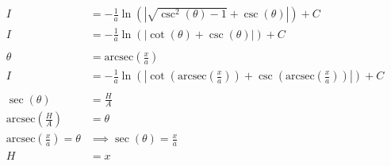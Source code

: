 \documentclass[12pt]{article}
\begin{document}
\begin{align}
    I                                                      & = -\frac{1}{a} \ln(|\sqrt{\csc^2(\theta)-1}+\csc(\theta)|) + C                                                                                                \\
    I                                                      & = -\frac{1}{a} \ln(|\cot(\theta)+\csc(\theta)|) + C                                                                                                           \\
    \nonumber                                                                                                                                                                                                              \\
    \theta                                                 & = \text{arcsec}\left(\frac{x}{a}\right)
    \nonumber                                                                                                                                                                                                              \\
    I                                                      & = -\frac{1}{a} \ln\left(\left|\cot\left(\text{arcsec}\left(\frac{x}{a}\right)\right)+\csc\left(\text{arcsec}\left(\frac{x}{a}\right)\right)\right|\right) + C \\
    \nonumber                                                                                                                                                                                                              \\
    \sec(\theta)                                           & = \frac{H}{A}                                                                                                                                                 \\
    \text{arcsec}\left(\frac{H}{A}\right)                  & = \theta                                                                                                                                                      \\
    \text{arcsec}\left(\frac{x}{a}\right) = \theta         & \implies \sec(\theta) = \frac{x}{a}                                                                                                                           \\
    H                                                      & = x                                                                                                                                                           \\

\end{align}
\end{document}
